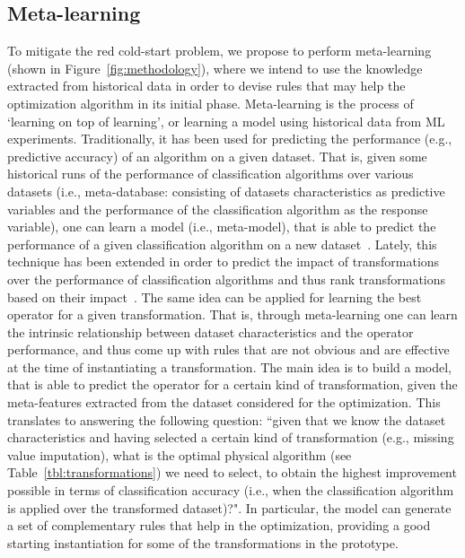 \subsection{Meta-learning}
\color{black}
To mitigate the red cold-start problem, we propose to perform meta-learning (shown in Figure~\ref{fig:methodology}), where we intend to use the knowledge extracted from historical data in order to devise rules that may help the optimization algorithm in its initial phase. 
Meta-learning is the process of `learning on top of learning', or learning a model using historical data from ML experiments. Traditionally, it has been used for predicting the performance (e.g., predictive accuracy) of an algorithm on a given dataset. That is, given some historical runs of the performance of classification algorithms over various datasets (i.e., meta-database: consisting of datasets characteristics as predictive variables and the performance of the classification algorithm as the response variable), one can learn a model (i.e., meta-model), that is able to predict the performance of a given classification algorithm on a new dataset~\cite{Brazdil04Book}. Lately, this technique has been extended in order to predict the impact of transformations over the performance of classification algorithms and thus rank transformations based on their impact~\cite{Bilalli17AMCS, presistant18CSI, presistant19DKE}. The same idea can be applied for learning the best operator for a given transformation.
That is, through meta-learning one can learn the intrinsic relationship between dataset characteristics and the operator performance, and thus come up with rules that are not obvious and are effective at the time of instantiating a transformation. 
The main idea is to build a model, that is able to predict the operator for a certain kind of transformation, given the meta-features extracted from the dataset considered for the optimization. This translates to answering the following question: ``given that we know the dataset characteristics and having selected a certain kind of transformation (e.g., missing value imputation), what is the optimal physical algorithm (see Table~\ref{tbl:transformations}) we need to select, to obtain the highest improvement possible in terms of classification accuracy (i.e., when the classification algorithm is applied over the transformed dataset)?".  In particular, the model can generate a set of complementary rules that help in the optimization, providing a good starting instantiation for some of the transformations in the prototype.

